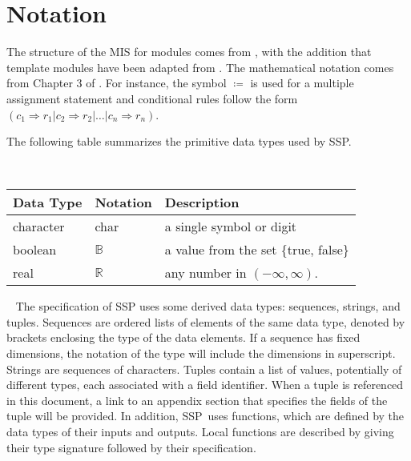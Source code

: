 \documentclass[12pt, titlepage]{article}
\newcommand{\progname}{SSP}
\begin{document}

\section{Notation}

The structure of the MIS for modules comes from \citet{HoffmanAndStrooper1995},
with the addition that template modules have been adapted from
\cite{GhezziEtAl2003}.  The mathematical notation comes from Chapter 3 of
\citet{HoffmanAndStrooper1995}.  For instance, the symbol $\coloneqq$ is used 
for a multiple assignment statement and conditional rules follow the form $(c_1
\Rightarrow r_1 | c_2 \Rightarrow r_2 | \dots | c_n \Rightarrow r_n )$.

The following table summarizes the primitive data types used by \progname.

~\newline \renewcommand*{\arraystretch}{1.5}
\begin{tabular}{p{} p{} p{}}
  \hline \textbf{Data Type} & \textbf{Notation} & \textbf{Description}
  \\ \hline
  
  character & char & a single symbol or digit\\

  boolean & $\mathbb{B}$ & a value from the set \{true, false\}\\
  
  real & $\mathbb{R}$ & any number in $\left( -\infty, \infty \right)$.\\
  \bottomrule
\end{tabular}

~\newline
The specification of \progname{} uses some derived data types: sequences, 
strings, and tuples. Sequences are ordered lists of elements of the same data 
type, denoted by brackets enclosing the type of the data elements. If a 
sequence has fixed dimensions, the notation of the type will include the 
dimensions in superscript. Strings are sequences of characters. Tuples contain 
a list of values, potentially of different types, each associated with a field 
identifier. When a tuple is referenced in this document, a link to an appendix 
section that specifies the fields of the tuple will be provided. In addition, 
\progname \ uses functions, which are defined by the data types of their inputs 
and outputs. Local functions are described by giving their type signature 
followed by their specification.
\end{document}
